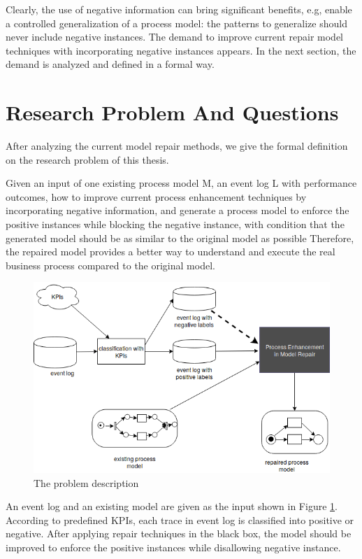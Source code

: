 Clearly, the use of negative information can bring significant benefits, e.g, enable a controlled generalization of a process model: the patterns to generalize should never include negative instances. The demand to improve current repair model techniques with incorporating negative instances appears. In the next section, the demand is analyzed and defined in a formal way.

\section{Research Problem And Questions}
After analyzing the current model repair methods, we give the formal definition on the research problem of this thesis.
\begin{definition}
Given an input of one existing process model M, an event log L with performance outcomes, how to improve current process enhancement techniques by incorporating negative information, and generate a process model to enforce the positive instances while blocking the negative instance, with condition that the generated model should be as similar to the original model as possible Therefore, the repaired model provides a better way to understand and execute the real business process compared to the original model.
\end{definition}
\begin{figure}
	\centering
	\includegraphics[width=\textwidth]{figures/introduction/FD_approach_blackbox.png}
	\caption{The problem description}
	\label{fig:method_architecture}
\end{figure}
An event log and an existing model are given as the input shown in Figure \ref{fig:method_architecture}. According to predefined KPIs, each trace in event log is classified into positive or negative. After applying repair techniques in the black box, the model should be improved to enforce the positive instances while disallowing negative instance.  

